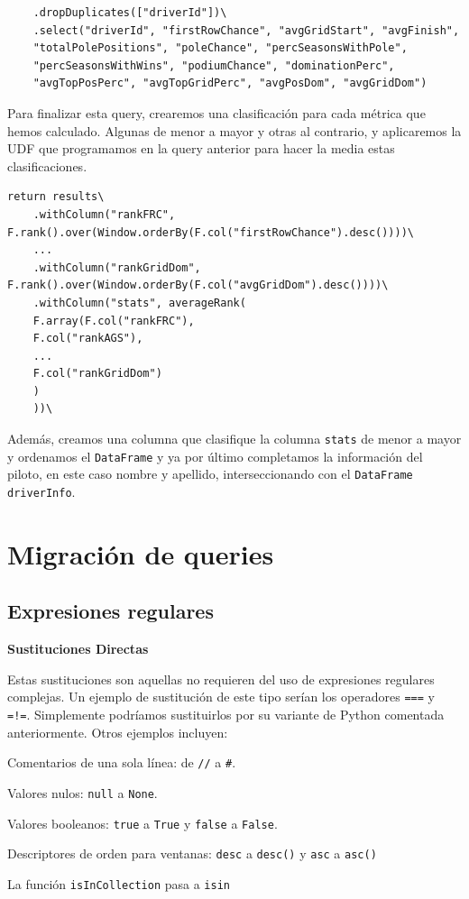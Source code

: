 \documentclass[12pt,twoside,titlepage]{report}
\begin{document}
\begin{lstlisting}
	.dropDuplicates(["driverId"])\
	.select("driverId", "firstRowChance", "avgGridStart", "avgFinish", 
	"totalPolePositions", "poleChance", "percSeasonsWithPole", 
	"percSeasonsWithWins", "podiumChance", "dominationPerc", 
	"avgTopPosPerc", "avgTopGridPerc", "avgPosDom", "avgGridDom")
\end{lstlisting}

Para finalizar esta query, crearemos una clasificación para cada métrica que hemos calculado. Algunas de menor a mayor y otras al contrario, y aplicaremos la UDF que programamos en la query anterior para hacer la media estas clasificaciones.

\begin{lstlisting}
return results\
	.withColumn("rankFRC", F.rank().over(Window.orderBy(F.col("firstRowChance").desc())))\
	...
	.withColumn("rankGridDom", F.rank().over(Window.orderBy(F.col("avgGridDom").desc())))\
	.withColumn("stats", averageRank(
	F.array(F.col("rankFRC"),
	F.col("rankAGS"),
	...
	F.col("rankGridDom")
	)
	))\
\end{lstlisting}

Además, creamos una columna que clasifique la columna \texttt{stats} de menor a mayor y ordenamos el \texttt{DataFrame} y ya por último completamos la información del piloto, en este caso nombre y apellido, interseccionando con el \texttt{DataFrame} \texttt{driverInfo}.

\chapter{Migración de queries}

\section{Expresiones regulares}
\label{sec:regexplained}

\textbf{Sustituciones Directas}

Estas sustituciones son aquellas no requieren del uso de expresiones regulares complejas. Un ejemplo de sustitución de este tipo serían los operadores \texttt{===} y \texttt{=!=}. Simplemente podríamos sustituirlos por su variante de Python comentada anteriormente. Otros ejemplos incluyen:

\begin{compactitem}
	\item Comentarios de una sola línea: de \texttt{//} a \texttt{\#}.
	\item Valores nulos: \texttt{null} a \texttt{None}.
	\item Valores booleanos: \texttt{true} a \texttt{True} y \texttt{false} a \texttt{False}.
	\item Descriptores de orden para ventanas: \texttt{desc} a \texttt{desc()} y \texttt{asc} a \texttt{asc()}
	\item La función \texttt{isInCollection} pasa a \texttt{isin}
\end{compactitem}
\end{document}
